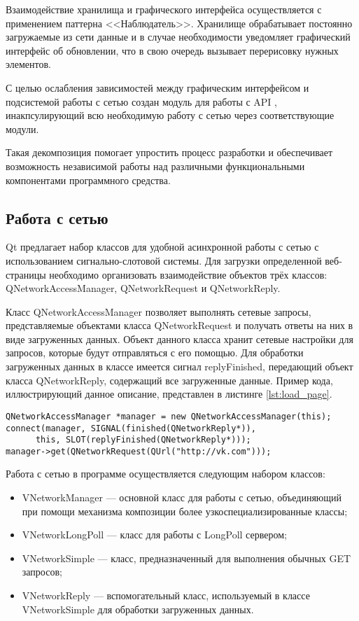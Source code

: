 Взаимодействие хранилища и графического интерфейса осуществляется с применением
паттерна <<Наблюдатель>>. Хранилище обрабатывает постоянно загружаемые из сети
данные и в случае необходимости уведомляет графический интерфейс об обновлении,
что в свою очередь вызывает перерисовку нужных элементов.

С целью ослабления зависимостей между графическим интерфейсом и подсистемой
работы с сетью создан модуль для работы с API \vk{}, инакпсулирующий всю
необходимую работу с сетью через соответствующие модули.

Такая декомпозиция помогает упростить процесс разработки и обеспечивает
возможность независимой работы над различными функциональными компонентами
программного средства.

\subsection{Работа с сетью}
Qt предлагает набор классов для удобной асинхронной работы с сетью с
использованием сигнально-слотовой системы. Для загрузки определенной
веб-страницы необходимо организовать взаимодействие объектов трёх классов:
QNetworkAccessManager, QNetworkRequest и QNetworkReply.

Класс QNetworkAccessManager позволяет выполнять сетевые запросы, представляемые
объектами класса QNetworkRequest и получать ответы на них в виде загруженных
данных. Объект данного класса хранит сетевые настройки для запросов, которые
будут отправляться с его помощью. Для обработки загруженных данных в классе
имеется сигнал replyFinished, передающий объект класса QNetworkReply, содержащий
все загруженные данные. Пример кода, иллюстрирующий данное описание, представлен
в листинге \ref{lst:load_page}.

\begin{lstlisting}[style = cstyle, 
				   caption = {Загрузка страницы с использованием Qt},
				   label = lst:load_page] 
QNetworkAccessManager *manager = new QNetworkAccessManager(this);
connect(manager, SIGNAL(finished(QNetworkReply*)),
 	  this, SLOT(replyFinished(QNetworkReply*)));
manager->get(QNetworkRequest(QUrl("http://vk.com")));
\end{lstlisting}

Работа с сетью в программе осуществляется следующим набором классов:
\begin{itemize}
  \item VNetworkManager --- основной класс для работы с сетью, объединяющий при
  помощи механизма композиции более узкоспециализированные классы;
  \item VNetworkLongPoll --- класс для работы с LongPoll сервером;
  \item VNetworkSimple --- класс, предназначенный для выполнения обычных
  GET запросов;
  \item VNetworkReply --- вспомогательный класс, используемый в
  классе VNetworkSimple для обработки загруженных данных.  
\end{itemize}

